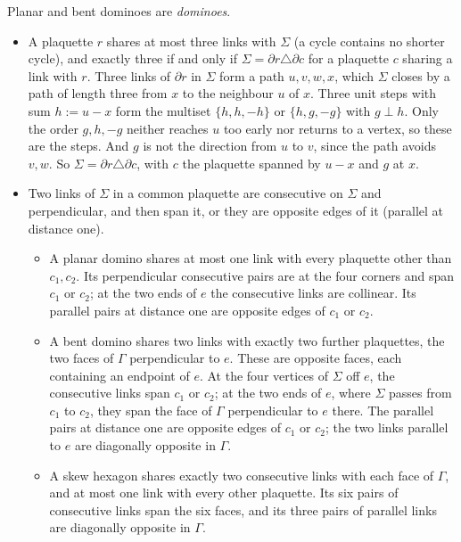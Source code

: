\documentclass[11pt,a4paper]{article}
\theoremstyle{definition}
\theoremstyle{remark}
\begin{document}
Planar and bent dominoes are \emph{dominoes}.
\begin{itemize}
\item[(F1)] A plaquette $r$ shares at most three links with $\Sigma$ (a cycle contains no shorter cycle), and exactly three if and only if $\Sigma=\partial r\triangle\partial c$ for a plaquette $c$ sharing a link with $r$.
Three links of $\partial r$ in $\Sigma$ form a path $u,v,w,x$, which $\Sigma$ closes by a path of length three from $x$ to the neighbour $u$ of $x$. Three unit steps with sum $h:=u-x$
form the multiset $\{h,h,-h\}$ or $\{h,g,-g\}$ with $g\perp h$. Only the order $g,h,-g$ neither reaches $u$ too early nor returns to a vertex, so these are the steps. And $g$ is not the
direction from $u$ to $v$, since the path avoids $v,w$. So $\Sigma=\partial r\triangle\partial c$, with $c$ the plaquette spanned by $u-x$ and $g$ at $x$.
\item[(F2)] Two links of $\Sigma$ in a common plaquette are consecutive on $\Sigma$ and perpendicular, and then span it, or they are opposite edges of it (parallel at distance one).
\begin{itemize}
\item A planar domino shares at most one link with every plaquette other than $c_1,c_2$. Its perpendicular consecutive pairs are at the four corners and span $c_1$ or $c_2$; at the
two ends of $e$ the consecutive links are collinear. Its parallel pairs at distance one are opposite edges of $c_1$ or $c_2$.
\item A bent domino shares two links with exactly two further plaquettes, the two faces of $\Gamma$ perpendicular to $e$. These are opposite faces, each containing an endpoint
of $e$. At the four vertices of $\Sigma$ off $e$, the consecutive links span $c_1$ or $c_2$; at the two ends of $e$, where $\Sigma$ passes from $c_1$ to $c_2$, they span the face of
$\Gamma$ perpendicular to $e$ there. The parallel pairs at distance one are opposite edges of $c_1$ or $c_2$; the two links parallel to $e$ are diagonally opposite in $\Gamma$.
\item A skew hexagon shares exactly two consecutive links with each face of $\Gamma$, and at most one link with every other plaquette. Its six pairs of consecutive links span the six
faces, and its three pairs of parallel links are diagonally opposite in $\Gamma$.
\end{itemize}
\end{itemize}
\end{document}
